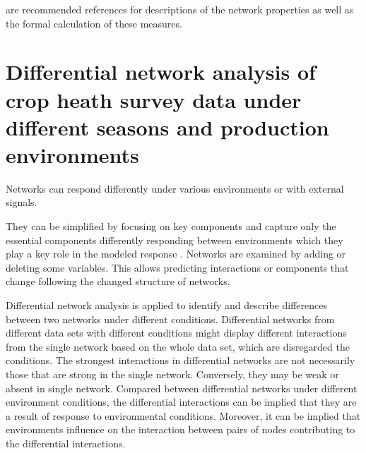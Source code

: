  are recommended references for descriptions of the network properties as well as the formal calculation of these measures.

\section*{Differential network analysis of crop heath survey data under different seasons and production environments}



Networks can respond differently under various environments or with external signals.

They can be simplified by focusing on key components and capture only the essential components differently responding between environments which they play a key role in the modeled response . Networks are examined by adding or deleting some variables. This allows predicting interactions or components that change following the changed structure of networks. 


Differential network analysis is applied to identify and describe differences between two networks under different conditions. Differential networks from different data sets with different conditions might display different interactions from the single network based on the whole data set, which are disregarded the conditions. The strongest interactions in differential networks are not necessarily those that are strong in the single network. Conversely, they may be weak or absent in single network. Compared between differential networks under different environment conditions, the differential interactions can be implied that they are a result of response to environmental conditions. Moreover, it can be implied that environments influence on the interaction between pairs of nodes contributing to the differential interactions. 

